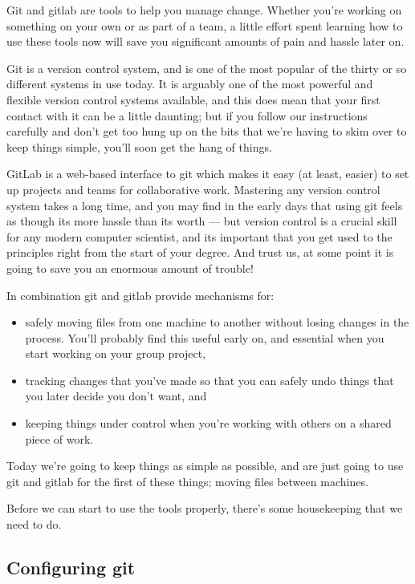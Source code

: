 Git and gitlab are tools to help you manage change. Whether you're working on something on your own or as part of a team, a little effort spent learning how to use these tools now will save you significant amounts of pain and hassle later on. 

Git is a version control system, and is one of the most popular of the thirty or so different systems in use today. It is arguably one of the most powerful and flexible version control systems available, and this does mean that your first contact with it can be a little daunting; but if you follow our instructions carefully and don't get too hung up on the bits that we're having to skim over to keep things simple, you'll soon get the hang of things. 

GitLab is a web-based interface to git which makes it easy (at least, easier) to set up projects and teams for collaborative work. Mastering any version control system takes a long time, and you may find in the early days that using git feels as though its more hassle than its worth --- but version control is a crucial skill for any modern computer scientist, and its important that you get used to the principles right from the start of your degree. And trust us, at some point it is going to save you an enormous amount of trouble!

In combination git and gitlab provide mechanisms for:
\begin{itemize}
\item safely moving files from one machine to another without losing changes in the process. You'll probably find this useful early on, and essential when you start working on your group project,
\item tracking changes that you've made so that you can safely undo things that you later decide you don't want, and
\item keeping things under control when you're working with others on a shared piece of work.
\end{itemize}

Today we're going to keep things as simple as possible, and are just going to use git and gitlab for the first of these things; moving files between machines. 

Before we can start to use the tools properly, there's some housekeeping that we need to do. 

\subsection{Configuring git}

